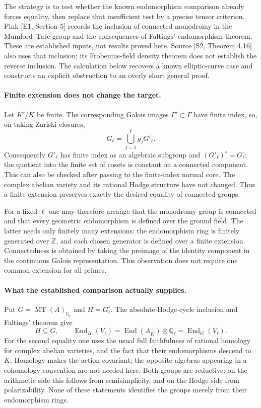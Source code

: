 \documentclass[11pt]{article}
\begin{document}
The strategy is to test whether the known endomorphism comparison
already forces equality, then replace that insufficient test by a
precise tensor criterion. Pink [E1, Section 5] records the inclusion
of connected monodromy in the Mumford--Tate group and the consequences
of Faltings' endomorphism theorem. These are established inputs, not
results proved here. Source [S2, Theorem 4.16] also uses that inclusion;
its Frobenius-field density theorem does not establish the reverse
inclusion. The calculation below recovers a known elliptic-curve case
and constructs an explicit obstruction to an overly short general proof.

\paragraph{Finite extension does not change the target.}
Let $K'/K$ be finite. The corresponding Galois images $\Gamma'\subset
\Gamma$ have finite index, so, on taking Zariski closures,
\[
 G_\ell=\bigcup_{j=1}^t g_jG'_\ell.
\]
Consequently $G'_\ell$ has finite index as an algebraic subgroup and
$(G'_\ell)^\circ=G_\ell^\circ$: the quotient into the finite set of
cosets is constant on a connected component. This can also be checked
after passing to the finite-index normal core. The complex abelian
variety and its rational Hodge structure have not changed. Thus a
finite extension preserves exactly the desired equality of connected
groups.

For a fixed $\ell$ one may therefore arrange that the monodromy group
is connected and that every geometric endomorphism is defined over
the ground field. The latter needs only finitely many extensions:
the endomorphism ring is finitely generated over $\mathbb Z$, and each
chosen generator is defined over a finite extension. Connectedness is
obtained by taking the preimage of the identity component in the
continuous Galois representation. This observation does not require
one common extension for all primes.

\paragraph{What the established comparison actually supplies.}
Put $G=\operatorname{MT}(A)_{\mathbb Q_\ell}$ and $H=G_\ell^\circ$.
The absolute-Hodge-cycle inclusion and Faltings' theorem give
\begin{equation}\label{mt:known}
 H\subseteq G,\qquad
 \operatorname{End}_H(V_\ell)
 =\operatorname{End}(A_{\overline K})\otimes\mathbb Q_\ell
 =\operatorname{End}_G(V_\ell).
\end{equation}
For the second equality one uses the usual full faithfulness of rational
homology for complex abelian varieties, and the fact that their
endomorphisms descend to $\overline K$. Homology makes the action
covariant; the opposite algebras appearing in a cohomology convention
are not needed here. Both groups are reductive: on the arithmetic
side this follows from semisimplicity, and on the Hodge side from
polarizability. None of these statements identifies the groups merely
from their endomorphism rings.
\end{document}
